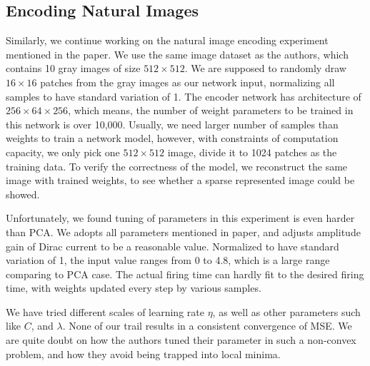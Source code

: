 \subsection{Encoding Natural Images}
Similarly, we continue working on the natural image encoding experiment mentioned in the paper. We use the same image dataset as the authors, which contains 10 gray images of size $512 \times 512$. We are supposed to randomly draw $16 \times 16$ patches from the gray images as our network input, normalizing all samples to have standard variation of 1. The encoder network has architecture of $256\times 64 \times 256$, which means, the number of weight parameters to be trained in this network is over 10,000. Usually, we need larger number of samples than weights to train a network model, however, with constraints of computation capacity, we only pick one $512 \times 512$ image, divide it to 1024 patches as the training data. To verify the correctness of the model, we reconstruct the same image with trained weights, to see whether a sparse represented image could be showed.

Unfortunately, we found tuning of parameters in this experiment is even harder than PCA. We adopts all parameters mentioned in paper, and adjusts amplitude gain of Dirac current to be a reasonable value. Normalized to have standard variation of 1, the input value ranges from 0 to 4.8, which is a large range comparing to PCA case. The actual firing time can hardly fit to the desired firing time, with weights updated every step by various samples.

We have tried different scales of learning rate $\eta$, as well as other parameters such like $C$, and $\lambda$. None of our trail results in a consistent convergence of MSE. We are quite doubt on how the authors tuned their parameter in such a non-convex problem, and how they avoid being trapped into local minima.

